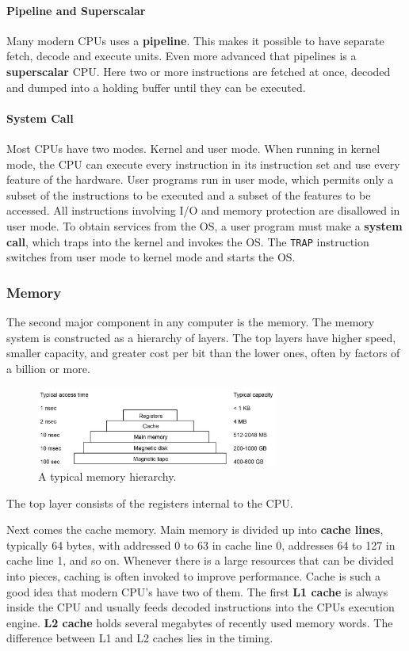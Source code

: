 \documentclass[11pt,a4paper]{article}
\begin{document}
\paragraph{Pipeline and Superscalar}
Many modern CPUs uses a \textbf{pipeline}. This makes it possible to have separate fetch, decode and execute units. Even more advanced that pipelines is a \textbf{superscalar} CPU. Here two or more instructions are fetched at once, decoded and dumped into a holding buffer until they can be executed. 

\paragraph{System Call}
Most CPUs have two modes. Kernel and user mode. When running in kernel mode, the CPU can execute every instruction in its instruction set and use every feature of the hardware. User programs run in  user mode, which permits only a subset of the instructions to be executed and a subset of the features to be accessed.  All instructions involving I/O and memory protection are disallowed in user mode. To obtain services from the OS, a user program must make a \textbf{system call}, which traps into the kernel and invokes the OS. The \texttt{TRAP} instruction switches from user mode to kernel mode and starts the OS. 

\subsubsection{Memory}
The second major component in any computer is the memory. The memory system is constructed as a hierarchy of layers. The top layers have higher speed, smaller capacity, and greater cost per bit than the lower ones, often by factors of a billion or more.

\begin{figure}[h!]
	\centering
		\includegraphics[width=300px]{memhi-01.png}
	\caption{A typical memory hierarchy.}
\end{figure}

The top layer consists of the registers internal to the CPU. 

Next comes the cache memory. Main memory is divided up into \textbf{cache lines}, typically 64 bytes, with addressed 0 to 63 in cache line 0, addresses 64 to 127 in cache line 1, and so on. Whenever there is a large resources that can be divided into pieces, caching is often invoked to improve performance. Cache is such a good idea that modern CPU's have two of them. The first \textbf{L1 cache} is always inside the CPU and usually feeds decoded instructions into the CPUs execution engine. \textbf{L2 cache} holds several megabytes of recently used memory words. The difference between L1 and L2 caches lies in the timing.
\end{document}
